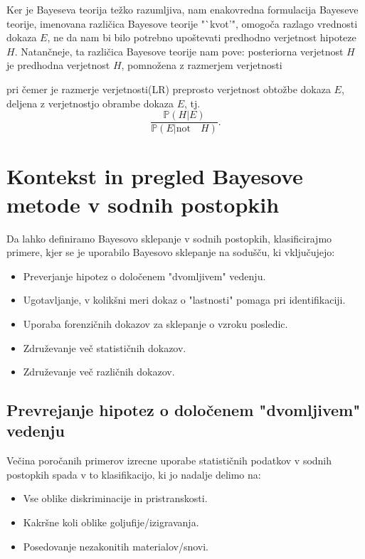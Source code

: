 \documentclass[a4paper,12pt]{article}
\begin{document}
Ker je Bayeseva teorija težko razumljiva, nam enakovredna formulacija Bayeseve teorije, imenovana različica Bayesove teorije "`kvot'", 
omogoča razlago vrednosti dokaza $E$, ne da nam bi bilo potrebno upoštevati predhodno verjetnost hipoteze $H$. Natančneje, ta različica 
Bayesove teorije nam pove:\vspace{5mm}
posteriorna verjetnost $H$ je predhodna verjetnost $H$, pomnožena z razmerjem verjetnosti  
\vspace{5mm}

pri čemer je razmerje verjetnosti(LR) preprosto verjetnost obtožbe dokaza $E$, deljena z verjetnostjo obrambe dokaza $E$, tj.
\[\frac{\mathbb{P}(H \lvert E)}{\mathbb{P}(E \lvert \text{not} \quad H)}.\]

\section{Kontekst in pregled Bayesove metode v sodnih postopkih}
Da lahko definiramo Bayesovo sklepanje v sodnih postopkih, klasificirajmo primere, kjer se je uporabilo Bayesovo sklepanje na sodušču, 
ki vključujejo:
\begin{itemize}
    \item Preverjanje hipotez o določenem "dvomljivem" vedenju.
    \item Ugotavljanje, v kolikšni meri dokaz o "lastnosti" pomaga pri identifikaciji.
    \item Uporaba forenzičnih dokazov za sklepanje o vzroku posledic.
    \item Združevanje več statističnih dokazov.
    \item Združevanje več različnih dokazov.
\end{itemize}

\subsection{Prevrejanje hipotez o določenem "dvomljivem" vedenju}
Večina poročanih primerov izrecne uporabe statističnih podatkov v sodnih postopkih spada v to klasifikacijo, ki jo nadalje delimo na:
\begin{itemize}
    \item Vse oblike diskriminacije in pristranskosti.
    \item Kakršne koli oblike goljufije/izigravanja.
    \item Posedovanje nezakonitih materialov/snovi.
\end{itemize}
\end{document}
